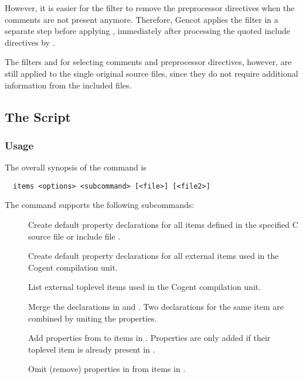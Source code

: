 However, it is easier for the filter  to remove the preprocessor directives when the comments are 
not present anymore. Therefore, Gencot applies the filter  in a separate step before applying
, immediately after processing the quoted include directives by .
 
The filters  and  for selecting comments and preprocessor directives, however, are
still applied to the single original source files, since they do not require additional information from the included files.


\subsection{The  Script}
\label{impl-all-items}

\subsubsection{Usage}

The overall synopsis of the  command is
\begin{verbatim}
  items <options> <subcommand> [<file>] [<file2>]
\end{verbatim}

The  command supports the following subcommands:
\begin{description}
\item[] Create default property declarations for all items defined in the specified C source file
or include file . 

\item[] Create default property declarations for all external items used in the Cogent compilation 
unit. 

\item[] List external toplevel items used in the Cogent compilation unit. 

\item[] Merge the declarations in  and . Two declarations for the 
same item are combined by uniting the properties.

\item[] Add properties from  to items in . Properties are only added
if their toplevel item is already present in .

\item[] Omit (remove) properties in  from items in . 

\end{description}

